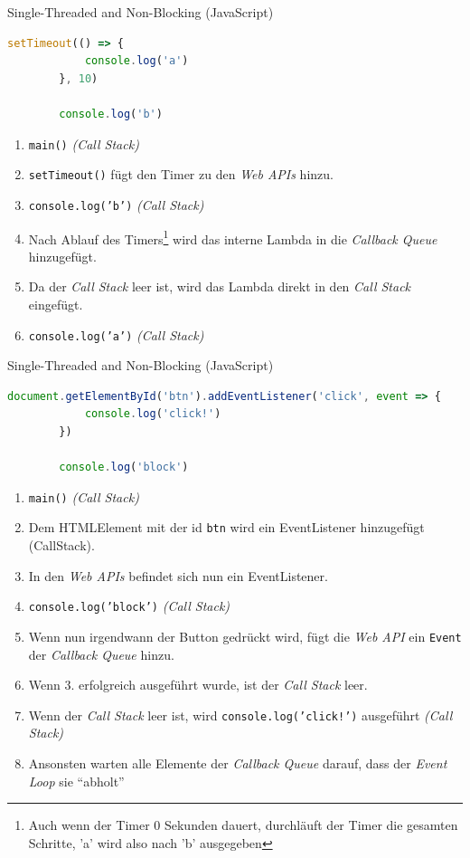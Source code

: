 \begin{example}{Single-Threaded and Non-Blocking (JavaScript)}
    \begin{lstlisting}[language=JavaScript]
        setTimeout(() => {
            console.log('a')
        }, 10)

        console.log('b')
    \end{lstlisting}

    \begin{enumerate}
        \item \texttt{main()} \emph{(Call Stack)}
        \item \texttt{setTimeout()} fügt den Timer zu den \emph{Web APIs} hinzu.
        \item \texttt{console.log('b')} \emph{(Call Stack)}
        \item Nach Ablauf des Timers\footnote{Auch wenn der Timer 0 Sekunden dauert, durchläuft der Timer die gesamten Schritte, 'a' wird also nach 'b' ausgegeben} wird das interne Lambda in die \emph{Callback Queue} hinzugefügt.
        \item Da der \emph{Call Stack} leer ist, wird das Lambda direkt in den \emph{Call Stack} eingefügt.
        \item \texttt{console.log('a')} \emph{(Call Stack)}
    \end{enumerate}
\end{example}

\begin{example}{Single-Threaded and Non-Blocking (JavaScript)}
    \begin{lstlisting}[language=JavaScript]
        document.getElementById('btn').addEventListener('click', event => {
            console.log('click!')
        })

        console.log('block')
    \end{lstlisting}

    \begin{enumerate}
        \item \texttt{main()} \emph{(Call Stack)}
        \item Dem HTMLElement mit der id \texttt{btn} wird ein EventListener hinzugefügt (CallStack).
        \item In den \emph{Web APIs} befindet sich nun ein EventListener.
        \item \texttt{console.log('block')} \emph{(Call Stack)}
        \item Wenn nun irgendwann der Button gedrückt wird, fügt die \emph{Web API} ein \texttt{Event} der \emph{Callback Queue} hinzu.
        \item Wenn 3. erfolgreich ausgeführt wurde, ist der \emph{Call Stack} leer.
        \item Wenn der \emph{Call Stack} leer ist, wird \texttt{console.log('click!')} ausgeführt \emph{(Call Stack)}
        \item Ansonsten warten alle Elemente der \emph{Callback Queue} darauf, dass der \emph{Event Loop} sie \enquote{abholt}
    \end{enumerate}
\end{example}

